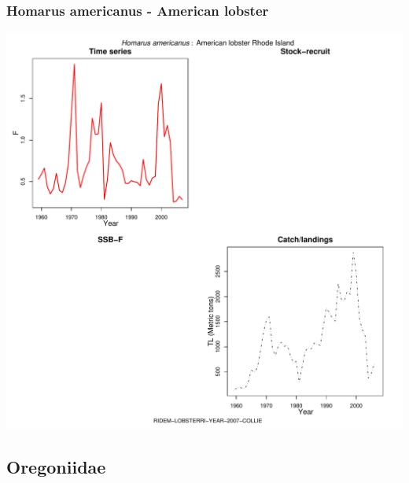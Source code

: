 \subsubsection{Homarus americanus - American lobster}
\begin{center}
\includegraphics[width=1.2\textwidth]{../R/figures/RIDEM-LOBSTERRI-YEAR-2007-COLLIE.pdf}
\end{center}

\subsection{Oregoniidae}

